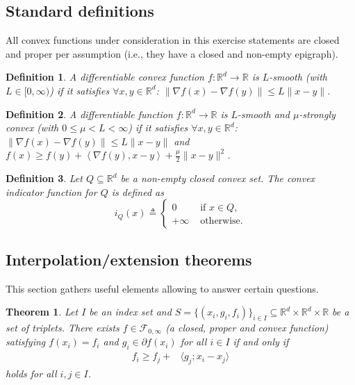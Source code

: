 \documentclass[11pt,a4paper]{article}
\newtheorem{theorem}{Theorem}
\newtheorem{definition}{Definition}
\begin{document}
	\subsection{Standard definitions}
	All convex functions under consideration in this exercise statements are closed and proper per assumption (i.e., they have a closed and non-empty epigraph).
	\begin{definition}\label{def:smoothconvex}
	A differentiable convex function $f:\mathbb{R}^d\rightarrow \mathbb{R}$ is $L$-smooth (with $L\in [0,\infty)$) if it satisfies $\forall x,y\in\mathbb{R}^d$: $\|\nabla f(x)-\nabla f(y)\|\leqslant L \|x-y\|$.
	\end{definition}
	\begin{definition}\label{def:smoothstronglyconvex}
	A differentiable function $f:\mathbb{R}^d\rightarrow \mathbb{R}$ is $L$-smooth and $\mu$-strongly convex (with $0\leqslant \mu<L<\infty$) if it satisfies $\forall x,y\in\mathbb{R}^d$: $\|\nabla f(x)-\nabla f(y)\|\leqslant L \|x-y\|$ and $f(x) \geqslant f(y) + \left< \nabla f(y), x - y \right> + \frac{\mu}{2} \|x-y\|^2$.
	\end{definition}
	\begin{definition}\label{def:indicator}
	Let $Q\subseteq \mathbb{R}^d$ be a non-empty closed convex set. The convex indicator function for $Q$ is defined as 
	\[ i_Q(x) \triangleq \left\{\begin{array}{ll}0 &\text{ if }x\in Q,\\+\infty &\text{ otherwise.}\end{array}\right. \]
	\end{definition}
	
	\subsection{Interpolation/extension theorems}
	This section gathers useful elements allowing to answer certain questions.


	\begin{theorem}Let $I$ be an index set and $S=\{(x_i,g_i,f_i)\}_{i\in I}\subseteq \mathbb{R}^d\times\mathbb{R}^d\times \mathbb{R}$ be a set of triplets. There exists $f\in\mathcal{F}_{0,\infty}$ (a closed, proper and convex function) satisfying $f(x_i)=f_i$ and $g_i\in\partial f(x_i)$ for all $i\in I$ if and only if
\begin{equation*}
\begin{aligned}
f_i\geqslant f_j+&\langle g_j;x_i-x_j\rangle
\end{aligned}
\end{equation*}
holds for all $i,j\in I$.
	\end{theorem}
	
\end{document}
